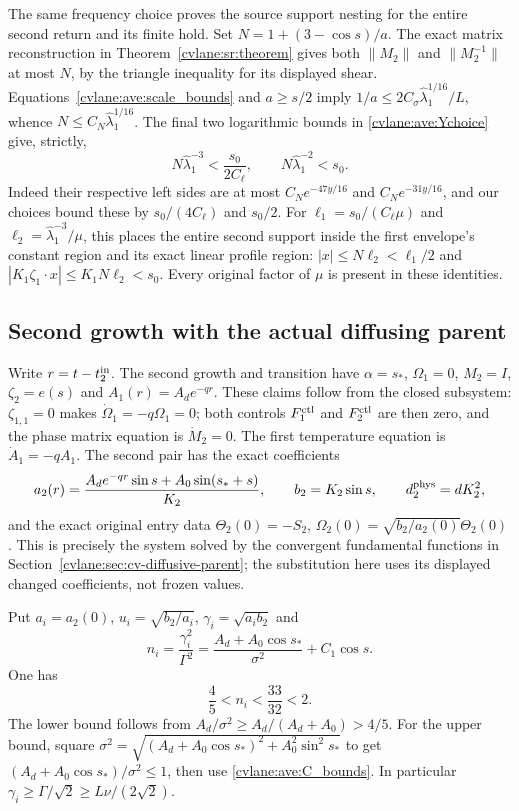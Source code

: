 The same frequency choice proves the source support nesting for the
entire second return and its finite hold. Set
$N=1+(3-\cos s)/a$. The exact matrix reconstruction in
Theorem~\ref{cvlane:sr:theorem} gives both $\|M_2\|$ and $\|M_2^{-1}\|$
at most $N$, by the triangle inequality for its displayed shear.
Equations~\eqref{cvlane:ave:scale_bounds} and $a\geq s/2$ imply
$1/a\leq 2C_\sigma\widehat\lambda_1^{1/16}/L$, whence
$N\leq C_N\widehat\lambda_1^{1/16}$.
The final two logarithmic bounds in \eqref{cvlane:ave:Ychoice} give, strictly,
\begin{equation}\label{cvlane:ave:nesting}
 N\widehat\lambda_1^{-3}<\frac{s_0}{2C_\ell},
 \qquad N\widehat\lambda_1^{-2}<s_0.
\end{equation}
Indeed their respective left sides are at most
$C_Ne^{-47y/16}$ and $C_Ne^{-31y/16}$, and our choices bound these
by $s_0/(4C_\ell)$ and $s_0/2$.
For $\ell_1=s_0/(C_\ell\mu)$ and
$\ell_2=\widehat\lambda_1^{-3}/\mu$, this places the entire second
support inside the first envelope's constant region and its exact
linear profile region: $|x|\leq N\ell_2<\ell_1/2$ and
$|K_1\zeta_1\cdot x|\leq K_1N\ell_2<s_0$.
Every original factor of $\mu$ is present in these identities.

\subsection{Second growth with the actual diffusing parent}

Write $r=t-t_2^{\rm in}$. The second growth and transition have
$\alpha=s_*$, $\Omega_1=0$, $M_2=I$, $\zeta_2=e(s)$ and
$A_1(r)=A_de^{-qr}$. These claims follow from the closed subsystem:
$\zeta_{1,1}=0$ makes $\dot\Omega_1=-q\Omega_1=0$;
both controls $F_1^{\rm ctl}$ and $F_2^{\rm ctl}$ are then zero,
and the phase matrix equation is $\dot M_2=0$. The first temperature
equation is $\dot A_1=-qA_1$.
The second pair has the exact coefficients
\begin{equation}\label{cvlane:ave:growth_coefficients}
 a_2(r)=\frac{A_de^{-qr}\sin s+A_0\sin(s_*+s)}{K_2},
 \qquad b_2=K_2\sin s,
 \qquad d_2^{\rm phys}=dK_2^2,
\end{equation}
and the exact original entry data
$\Theta_2(0)=-S_2$, $\Omega_2(0)=\sqrt{b_2/a_2(0)}\Theta_2(0)$.
This is precisely the system solved by the convergent fundamental
functions in Section~\ref{cvlane:sec:cv-diffusive-parent}; the substitution
here uses its displayed changed coefficients, not frozen values.

Put $a_i=a_2(0)$, $u_i=\sqrt{b_2/a_i}$,
$\gamma_i=\sqrt{a_i b_2}$ and
\[
 n_i=\frac{\gamma_i^2}{\Gamma^2}
 =\frac{A_d+A_0\cos s_*}{\sigma^2}+C_1\cos s.
\]
One has
\begin{equation}\label{cvlane:ave:ni_bounds}
 \frac45<n_i<\frac{33}{32}<2.
\end{equation}
The lower bound follows from
$A_d/\sigma^2\geq A_d/(A_d+A_0)>4/5$.
For the upper bound, square
$\sigma^2=\sqrt{(A_d+A_0\cos s_*)^2+A_0^2\sin^2s_*}$
to get $(A_d+A_0\cos s_*)/\sigma^2\leq1$, then use
\eqref{cvlane:ave:C_bounds}. In particular
$\gamma_i\geq\Gamma/\sqrt2\geq L\nu/(2\sqrt2)$.

